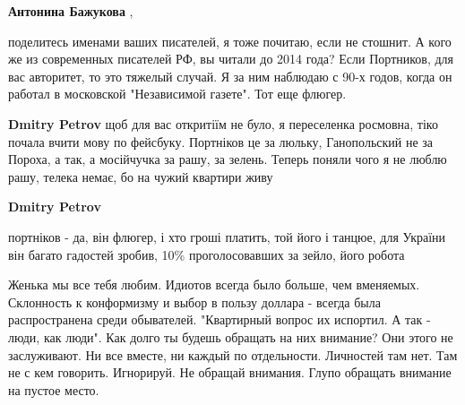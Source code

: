 \begin{itemize}
\begin{itemize}
\textbf{Антонина Бажукова} , 

поделитесь именами ваших писателей, я тоже
почитаю, если не стошнит. А кого же из современных писателей РФ, вы читали до
2014 года? Если Портников, для вас авторитет, то это тяжелый случай. Я за ним
наблюдаю с 90-х годов, когда он работал в московской "Независимой газете". Тот
еще флюгер.

 
\textbf{Dmitry Petrov} щоб для вас откритіїм не було, я переселенка росмовна, тіко почала вчити мову по фейсбуку. Портніков це за люльку, Ганопольский не за Пороха, а так, а мосійчучка за рашу, за зелень. Теперь поняли чого я не люблю рашу, телека немає, бо на чужий квартири живу

 
\textbf{Dmitry Petrov} 

портніков - да, він флюгер, і хто гроші платить, той його і танцюе, для України
він багато гадостей зробив, 10\% проголосовавших за зейло, його робота

\end{itemize}

 

Женька мы все тебя любим. Идиотов всегда было больше, чем вменяемых. Склонность
к конформизму и выбор в пользу доллара - всегда была распространена среди
обывателей. "Квартирный вопрос их испортил. А так - люди, как люди". Как долго
ты будешь обращать на них внимание? Они этого не заслуживают. Ни все вместе, ни
каждый по отдельности. Личностей там нет. Там не с кем говорить. Игнорируй. Не
обращай внимания. Глупо обращать внимание на пустое место.


 

\end{itemize}
